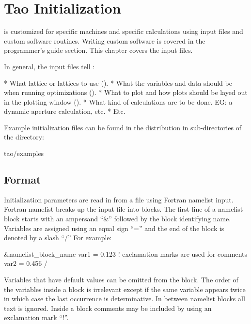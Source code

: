 \chapter{Tao Initialization}
\label{c:init}

\tao is customized for specific machines and specific calculations
using input files and custom software routines. Writing custom
software is covered in the programmer's guide section. This chapter
covers the input files.

In general, the input files tell \tao:
\begin{example}
  * What \bmad lattice or lattices to use ().
  * What the variables and data should be when running optimizations ().
  * What to plot and how plots should be layed out in the plotting window ().
  * What kind of calculations are to be done. EG: a dynamic aperture calculation, etc.
  * Etc.
\end{example}

Example initialization files can be found in the \tao distribution in sub-directories of the
directory:
\begin{example}
  tao/examples
\end{example}

\section{Format}
\label{s:format}

Initialization parameters are read in from a file using Fortran
namelist input. Fortran namelist breaks up the input file into
blocks. The first line of a namelist block starts with an ampersand
``\&'' followed by the block identifying name. Variables are assigned
using an equal sign ``='' and the end of the block is denoted by a
slash ``/'' For example:
\begin{example}
  &namelist_block_name
    var1 = 0.123   ! exclamation marks are used for comments
    var2 = 0.456
  /
\end{example}
Variables that have default values can be omitted from the block.  The
order of the variables inside a block is irrelevant except if the
same variable appears twice in which case the last occurrence is determinative.
In between namelist blocks all text is ignored. Inside a block comments may be
included by using an exclamation mark ``!''.

